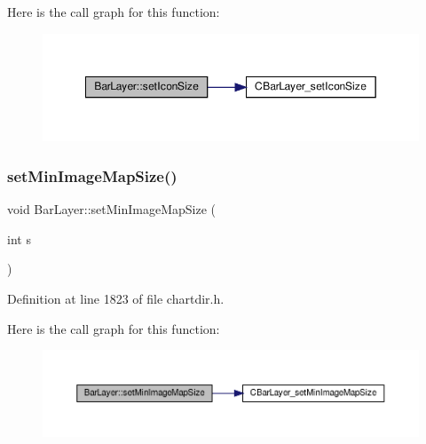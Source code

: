 Here is the call graph for this function\+:
\nopagebreak
\begin{figure}[H]
\begin{center}
\leavevmode
\includegraphics[width=349pt]{class_bar_layer_ad61ea98d0fbe8a5e312af13dc5e0f837_cgraph}
\end{center}
\end{figure}
\mbox{\label{class_bar_layer_a746e396fa24f9afd1f04f3534c05c17a}} 
\subsubsection{\texorpdfstring{set\+Min\+Image\+Map\+Size()}{setMinImageMapSize()}}
{\footnotesize\ttfamily void Bar\+Layer\+::set\+Min\+Image\+Map\+Size (\begin{DoxyParamCaption}\item[{int}]{s }\end{DoxyParamCaption})\hspace{0.3cm}{\ttfamily [inline]}}



Definition at line 1823 of file chartdir.\+h.

Here is the call graph for this function\+:
\nopagebreak
\begin{figure}[H]
\begin{center}
\leavevmode
\includegraphics[width=350pt]{class_bar_layer_a746e396fa24f9afd1f04f3534c05c17a_cgraph}
\end{center}
\end{figure}
\mbox{\label{class_bar_layer_a599f8b5e967c9f33662f1e9a89f7d2b4}} 
